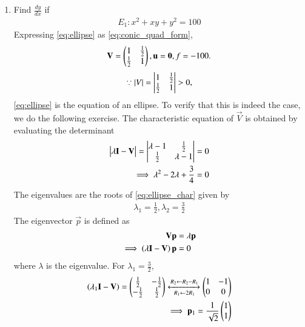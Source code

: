 \renewcommand{\theequation}{\theenumi}
\begin{enumerate}[label=\thesubsection.\arabic*.,ref=\thesubsection.\theenumi]
\item 
\label{ex:ellipse_tangent}
Find $\frac{dy}{dx}$ if 
\begin{align}
E_1: x^2 + xy +y^2  = 100
\label{eq:ellipse}
\end{align}
\solution Expressing \eqref{eq:ellipse}  as \eqref{eq:conic_quad_form}, 
\begin{align}
\mathbf{V} = \begin{pmatrix}1 & \frac{1}{2} \\ \frac{1}{2} & 1\end{pmatrix}, \mathbf{u} = \mathbf{0}, f = -100.
\label{eq:ellipse_ips}
\end{align}
%
\begin{align}
\because \left\vert V\right\vert = \begin{vmatrix}1 & \frac{1}{2} \\ \frac{1}{2} & 1\end{vmatrix} > 0,
\end{align}
\eqref{eq:ellipse} is the equation of an ellipse. To verify that this is indeed the case, we do the following exercise.
%
The characteristic equation of $\vec{V}$ is obtained by evaluating the determinant
\begin{align}
\begin{vmatrix}\lambda \mathbf{I}-\mathbf{V}\end{vmatrix} = \begin{vmatrix}\lambda -1 & \frac{1}{2}\\ \frac{1}{2} & \lambda -1\end{vmatrix} &= 0
\\
\implies \lambda^2 - 2\lambda + \frac{3}{4} &= 0
\label{eq:ellipse_char}
\end{align}
The eigenvalues are the roots of \eqref{eq:ellipse_char} given by
\begin{align}
\lambda_1 = \frac{1}{2}, \lambda_2 = \frac{3}{2}
\label{eq:ellipse_eval}
\end{align}
The eigenvector $\vec{p}$ is defined as
\begin{align}
\mathbf{V} \mathbf{p}&= \lambda \mathbf{p}
\\
\implies \left(\lambda\mathbf{I}-\mathbf{V}\right)\mathbf{p} &=0
\end{align}
where $\lambda$ is the eigenvalue.  For $\lambda_1 = \frac{3}{2}$,
\begin{align}
\brak{\lambda_1\vec{I}-\vec{V}}
= \myvec{\frac{1}{2} & -\frac{1}{2}
\\ -\frac{1}{2} & \frac{1}{2}} 
\xleftrightarrow[R_1 \leftarrow 2R_1] {R_2\leftarrow R_2-R_1}\myvec{1 & -1 \\0 & 0 }  
\\
\implies \vec{p}_1 = \frac{1}{\sqrt{2}}\myvec{1 \\ 1}

\end{align}
\end{enumerate}
